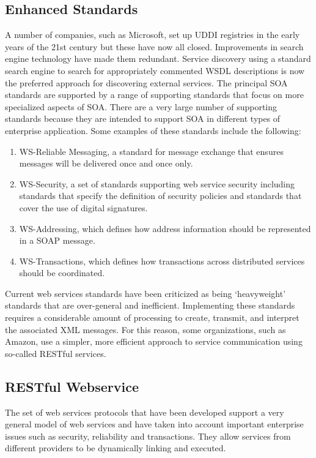\documentclass[12pt,a4paper,final,twoside,onecolumn,titlepage]{book}
\begin{document}
\subsection{Enhanced Standards}
A number of companies, such as Microsoft, set up \gls{UDDI} registries in the early years of the 21st century but these have now all closed. Improvements in search engine technology have made them redundant. Service discovery using a standard search engine to search for appropriately commented \gls{WSDL} descriptions is now the preferred approach for discovering external services.
The principal \gls{SOA} standards are supported by a range of supporting standards that focus on more specialized aspects of \gls{SOA}. There are a very large number of supporting standards because they are intended to support \gls{SOA} in different types of enterprise application. Some examples of these standards include the following:
\begin{enumerate}
\item WS-Reliable Messaging, a standard for message exchange that ensures messages will be delivered once and once only.
\item WS-Security, a set of standards supporting web service security including standards that specify the definition of security policies and standards that cover the use of digital signatures.
\item WS-Addressing, which defines how address information should be represented in a \gls{SOAP} message.
\item WS-Transactions, which defines how transactions across distributed services should be coordinated.
\end{enumerate}
Current web services standards have been criticized as being ‘heavyweight’ standards that are over-general and inefficient. Implementing these standards requires a considerable amount of processing to create, transmit, and interpret the associated \gls{XML} messages. For this reason, some organizations, such as Amazon, use a simpler, more efficient approach to service communication using so-called RESTful services.

\subsection{RESTful Webservice}
The set of web services protocols that have been developed support a very general model of web services and have taken into account important enterprise issues such as security, reliability and transactions. They allow services from different providers to be dynamically linking and executed.
\end{document}
